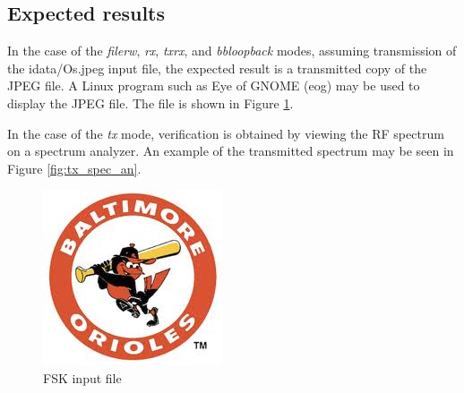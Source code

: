 \subsection{Expected results}
\noindent In the case of the \textit{filerw}, \textit{rx}, \textit{txrx}, and \textit{bbloopback} modes, assuming transmission of the idata/Os.jpeg input file, the expected result is a transmitted copy of the JPEG file. A Linux program such as Eye of GNOME (eog) may be used to display the JPEG file. The file is shown in Figure \ref{fig:os_pic}.\par\medskip
\noindent In the case of the \textit{tx} mode, verification is obtained by viewing the RF spectrum on a spectrum analyzer. An example of the transmitted spectrum may be seen in Figure \ref{fig:tx_spec_an}.\par\medskip
	\begin{figure}[ht]
	 	\centering
	 	\begin{minipage}{.325\textwidth}
			\centering\includegraphics[width=1.0\linewidth]{Os}
			\caption{FSK input file}
			\label{fig:os_pic}
		\end{minipage}
	 	\begin{minipage}{.45\textwidth}

\end{minipage}
\end{figure}
